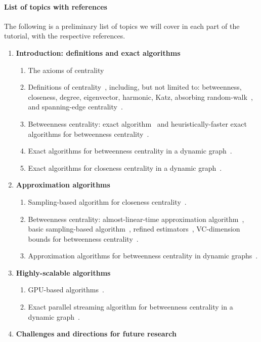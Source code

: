 \documentclass[pdfpagelabels=false]{sig-alternate-2013} %
\begin{document}
\paragraph{List of topics with references}
The following is a preliminary list of topics we will cover in each part of the
tutorial, with the respective references.
\begin{enumerate}
	\item {\bf Introduction: definitions and exact algorithms}
		\begin{enumerate}
			\item The axioms of centrality~\citep{BoldiV14}
			\item Definitions of centrality~\citep{Newman10}, including, but not
				limited to: betweenness, closeness, degree, eigenvector,
				harmonic, Katz, absorbing random-walk~\citep{MavroforakisMG15},
				and spanning-edge centrality~\citep{MavroforakisGLKT15}.
			\item Betweenness centrality: exact algorithm~\citep{Brandes01} and
				heuristically-faster exact algorithms for betweenness
				centrality~\citep{ErdosIBT15,SariyuceSKC13}.
			\item Exact algorithms for betweenness centrality in a dynamic
				graph~\citep{LeeLPCC12,NasrePR14,PontecorviR15}.
			\item Exact algorithms for closeness centrality in a dynamic
				graph~\citep{SariyuceKSC13b}.
		\end{enumerate}
	\item {\bf Approximation algorithms}
		\begin{enumerate}
			\item Sampling-based algorithm for closeness
				centrality~\citep{EppsteinW04}.
			\item Betweenness centrality: almost-linear-time approximation
				algorithm~\citep{Yoshida14}, basic sampling-based
				algorithm~\citep{BrandesP07}, refined
				estimators~\citep{GeisbergerSS08}, VC-dimension bounds for
				betweenness centrality~\citep{RiondatoK15}.
			\item Approximation algorithms for betweenness centrality in dynamic
				graphs~\citep{KasWCC13,BergaminiMS14,BergaminiM15,HayashiAY15}.
		\end{enumerate}
	\item {\bf Highly-scalable algorithms}
		\begin{enumerate}
			\item GPU-based algorithms~\citep{SariyuceKSC13}.
			\item Exact parallel streaming algorithm for betweenness centrality in a
				dynamic graph~\citep{KourtellisMB15}.
		\end{enumerate}
	\item {\bf Challenges and directions for future research}
\end{enumerate}
\end{document}
